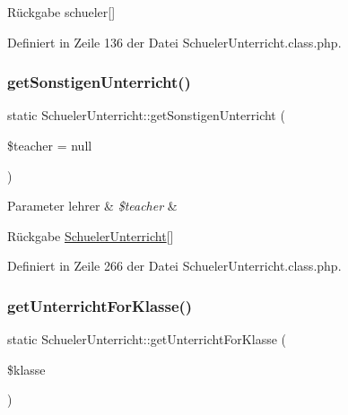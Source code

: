 \begin{DoxyReturn}{Rückgabe}
schueler\mbox{[}\mbox{]} 
\end{DoxyReturn}


Definiert in Zeile 136 der Datei Schueler\+Unterricht.\+class.\+php.

\mbox{\label{class_schueler_unterricht_ae13dabaca3bc47e628327535c446d22d}} 
\subsubsection{\texorpdfstring{get\+Sonstigen\+Unterricht()}{getSonstigenUnterricht()}}
{\footnotesize\ttfamily static Schueler\+Unterricht\+::get\+Sonstigen\+Unterricht (\begin{DoxyParamCaption}\item[{}]{\$teacher = {\ttfamily null} }\end{DoxyParamCaption})\hspace{0.3cm}{\ttfamily [static]}}


\begin{DoxyParams}[1]{Parameter}
lehrer & {\em \$teacher} & \\
\hline
\end{DoxyParams}
\begin{DoxyReturn}{Rückgabe}
\mbox{\hyperlink{class_schueler_unterricht}{Schueler\+Unterricht}}\mbox{[}\mbox{]} 
\end{DoxyReturn}


Definiert in Zeile 266 der Datei Schueler\+Unterricht.\+class.\+php.

\mbox{\label{class_schueler_unterricht_a7d858e9aa456de9903063c17c7b1f1cd}} 
\subsubsection{\texorpdfstring{get\+Unterricht\+For\+Klasse()}{getUnterrichtForKlasse()}}
{\footnotesize\ttfamily static Schueler\+Unterricht\+::get\+Unterricht\+For\+Klasse (\begin{DoxyParamCaption}\item[{}]{\$klasse }\end{DoxyParamCaption})\hspace{0.3cm}{\ttfamily [static]}}



